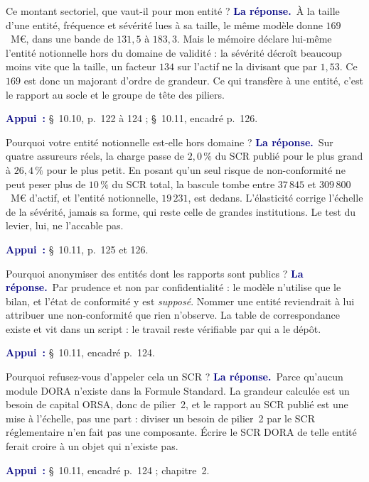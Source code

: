 \documentclass[11pt,a4paper]{article}
\newcommand{\rep}[1]{\smallskip\noindent\textcolor{navy}{\textbf{La réponse.}}\ #1\par}
\newcommand{\appui}[1]{\smallskip\noindent\small\textcolor{navy}{\textbf{Appui~:}} #1\par\normalsize}
\begin{document}
\begin{question}{\og Ce montant sectoriel, que vaut-il pour mon entité ?\fg{}}
\rep{À la taille d'une entité, fréquence et sévérité lues à sa taille, le même modèle donne
$169$~M\euro, dans une bande de $131{,}5$ à $183{,}3$. Mais le mémoire déclare lui-même l'entité
notionnelle hors du domaine de validité : la sévérité décroît beaucoup moins vite que la taille, un
facteur $134$ sur l'actif ne la divisant que par $1{,}53$. Ce $169$ est donc un majorant d'ordre
de grandeur. Ce qui transfère à une entité, c'est le rapport au socle et le groupe de tête des
piliers.}
\appui{\S~10.10, p.~122 à 124 ; \S~10.11, encadré p.~126.}
\end{question}

\begin{question}{\og Pourquoi votre entité notionnelle est-elle hors domaine ?\fg{}}
\rep{Sur quatre assureurs réels, la charge passe de $2{,}0\,\%$ du SCR publié pour le plus grand à
$26{,}4\,\%$ pour le plus petit. En posant qu'un seul risque de non-conformité ne peut peser plus de
$10\,\%$ du SCR total, la bascule tombe entre $37\,845$ et $309\,800$~M\euro{} d'actif, et l'entité
notionnelle, $19\,231$, est dedans. L'élasticité corrige l'échelle de la sévérité, jamais sa forme,
qui reste celle de grandes institutions. Le test du levier, lui, ne l'accable pas.}
\appui{\S~10.11, p.~125 et 126.}
\end{question}

\begin{question}{\og Pourquoi anonymiser des entités dont les rapports sont publics ?\fg{}}
\rep{Par prudence et non par confidentialité : le modèle n'utilise que le bilan, et l'état de
conformité y est \emph{supposé}. Nommer une entité reviendrait à lui attribuer une non-conformité
que rien n'observe. La table de correspondance existe et vit dans un script : le travail reste
vérifiable par qui a le dépôt.}
\appui{\S~10.11, encadré p.~124.}
\end{question}

\begin{question}{\og Pourquoi refusez-vous d'appeler cela un SCR ?\fg{}}
\rep{Parce qu'aucun module DORA n'existe dans la Formule Standard. La grandeur calculée est un
besoin de capital ORSA, donc de pilier~2, et le rapport au SCR publié est une mise à l'échelle,
pas une part : diviser un besoin de pilier~2 par le SCR réglementaire n'en fait pas une composante.
Écrire \og le SCR DORA de telle entité\fg{} ferait croire à un objet qui n'existe pas.}
\appui{\S~10.11, encadré p.~124 ; chapitre~2.}
\end{question}
\end{document}
